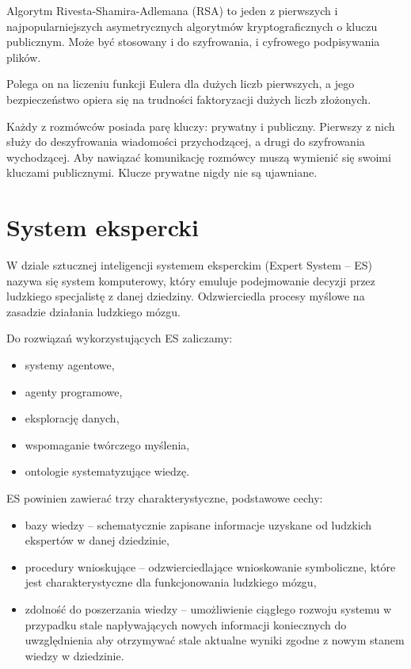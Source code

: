 \documentclass[12pt,a4paper]{article}
\begin{document}
	



	Algorytm Rivesta-Shamira-Adlemana (RSA) to jeden z pierwszych i najpopularniejszych asymetrycznych algorytmów kryptograficznych o kluczu publicznym. Może być stosowany i do szyfrowania, i cyfrowego podpisywania plików.
	
	\smallskip
	Polega on na liczeniu funkcji Eulera dla dużych liczb pierwszych, a jego bezpieczeństwo opiera się na trudności faktoryzacji dużych liczb złożonych.
	
	\smallskip
	Każdy z rozmówców posiada parę kluczy: prywatny i publiczny. Pierwszy z nich służy do deszyfrowania wiadomości przychodzącej, a drugi do szyfrowania wychodzącej. Aby nawiązać komunikację rozmówcy muszą wymienić się swoimi kluczami publicznymi. Klucze prywatne nigdy nie są ujawniane.
	
	
\section*{System ekspercki}

	W dziale sztucznej inteligencji systemem eksperckim (Expert System -- ES) nazywa się system komputerowy, który emuluje podejmowanie decyzji przez ludzkiego specjalistę z danej dziedziny. Odzwierciedla procesy myślowe na zasadzie działania ludzkiego mózgu.
	
	Do rozwiązań wykorzystujących ES zaliczamy:
	\begin{itemize}
		\item systemy agentowe,
		\item agenty programowe,
		\item eksplorację danych,
		\item wspomaganie twórczego myślenia,
		\item ontologie systematyzujące wiedzę.
	\end{itemize}
	\bigskip
	
	ES powinien zawierać trzy charakterystyczne, podstawowe cechy:
	\begin{itemize}
		\item bazy wiedzy -- schematycznie zapisane informacje uzyskane od ludzkich ekspertów w danej dziedzinie,
		\item procedury wnioskujące -- odzwierciedlające wnioskowanie symboliczne, które jest charakterystyczne dla funkcjonowania ludzkiego mózgu,
		\item zdolność do poszerzania wiedzy -- umożliwienie ciągłego rozwoju systemu w przypadku stale napływających nowych informacji koniecznych do uwzględnienia aby otrzymywać stale aktualne wyniki zgodne z nowym stanem wiedzy w dziedzinie.
	\end{itemize}
	\bigskip
	
\end{document}
